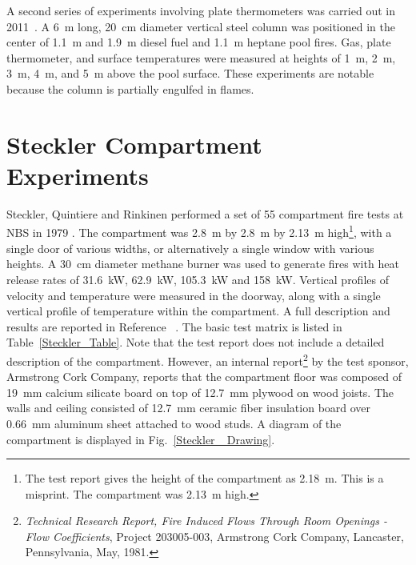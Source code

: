A second series of experiments involving plate thermometers was carried out in 2011~\cite{Sjostrom:AST}. A 6~m long, 20~cm diameter vertical steel column was positioned in the center of 1.1~m and 1.9~m diesel fuel and 1.1~m heptane pool fires. Gas, plate thermometer, and surface temperatures were measured at heights of 1~m, 2~m, 3~m, 4~m, and 5~m above the pool surface. These experiments are notable because the column is partially engulfed in flames.

\section{Steckler Compartment Experiments}

Steckler, Quintiere and Rinkinen performed a set of 55 compartment fire tests at NBS in 1979 \cite{Steckler:1982}. The compartment was 2.8~m by 2.8~m by 2.13~m high\footnote{The test report
gives the height of the compartment as 2.18~m. This is a misprint. The compartment was 2.13~m high.}, with a single door of
various widths, or alternatively a single window with various heights. A 30~cm diameter methane burner was used to generate fires with heat release rates of
31.6~kW, 62.9~kW, 105.3~kW and 158~kW. Vertical profiles of velocity and temperature were measured in the doorway, along with a single vertical profile of temperature
within the compartment.
A full description and results are reported in Reference~ \cite{Steckler:1982}. The basic test matrix is listed in Table~\ref{Steckler_Table}. Note that the
test report does not include a detailed description of the compartment. However, an internal report\footnote{ {\em Technical Research Report, Fire Induced Flows
Through Room Openings - Flow Coefficients}, Project 203005-003, Armstrong Cork Company, Lancaster, Pennsylvania, May, 1981.} by the test sponsor, Armstrong Cork Company,
reports that the compartment floor was composed of 19~mm calcium silicate board on top of 12.7~mm plywood on wood joists. The walls and ceiling consisted of
12.7~mm ceramic fiber insulation board over 0.66~mm aluminum sheet attached to wood studs. A diagram of the compartment is displayed in Fig.~\ref{Steckler_ Drawing}.

